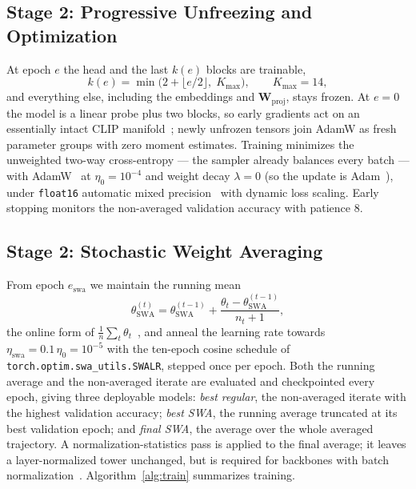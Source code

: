 \documentclass[10pt,journal]{IEEEtran}
\newcommand{\mat}[1]{\mathbf{#1}}
\begin{document}
\subsection{Stage 2: Progressive Unfreezing and Optimization}\label{sec:unfreeze}
At epoch $e$ the head and the last $k(e)$ blocks are trainable,
\begin{equation}
k(e)=\min\big(2+\lfloor e/2\rfloor,\;K_{\max}\big),\qquad K_{\max}=14,
\label{eq:schedule}
\end{equation}
and everything else, including the embeddings and $\mat{W}_{\mathrm{proj}}$,
stays frozen. At $e=0$ the model is a linear probe plus two blocks, so early
gradients act on an essentially intact CLIP manifold~\cite{kumar2022finetuning};
newly unfrozen tensors join AdamW as fresh parameter groups with zero moment
estimates. Training minimizes the unweighted two-way cross-entropy --- the
sampler already balances every batch --- with AdamW~\cite{loshchilov2019adamw}
at $\eta_0=10^{-4}$ and weight decay $\lambda=0$ (so the update is
Adam~\cite{kingma2015adam}), under \texttt{float16} automatic mixed
precision~\cite{micikevicius2018mixed} with dynamic loss scaling. Early
stopping monitors the non-averaged validation accuracy with patience $8$.

\subsection{Stage 2: Stochastic Weight Averaging}\label{sec:swa}
From epoch $e_{\mathrm{swa}}$ we maintain the running mean
\begin{equation}
\theta_{\mathrm{SWA}}^{(t)}=\theta_{\mathrm{SWA}}^{(t-1)}
  +\frac{\theta_t-\theta_{\mathrm{SWA}}^{(t-1)}}{n_t+1},
\label{eq:swa}
\end{equation}
the online form of $\frac{1}{n}\sum_t\theta_t$~\cite{izmailov2018swa}, and anneal
the learning rate towards $\eta_{\mathrm{swa}}=0.1\,\eta_0=10^{-5}$ with the
ten-epoch cosine schedule of \texttt{torch.optim.swa\_utils.SWALR}, stepped once
per epoch. Both the running average and the non-averaged iterate are evaluated
and checkpointed every epoch, giving three deployable models:
\emph{best regular}, the non-averaged iterate with the highest validation
accuracy; \emph{best SWA}, the running average truncated at its best
validation epoch; and \emph{final SWA}, the average over the whole averaged
trajectory. A normalization-statistics pass is applied to the final average;
it leaves a layer-normalized tower unchanged, but is required for backbones
with batch normalization~\cite{ioffe2015batchnorm}. Algorithm~\ref{alg:train}
summarizes training.
\end{document}
